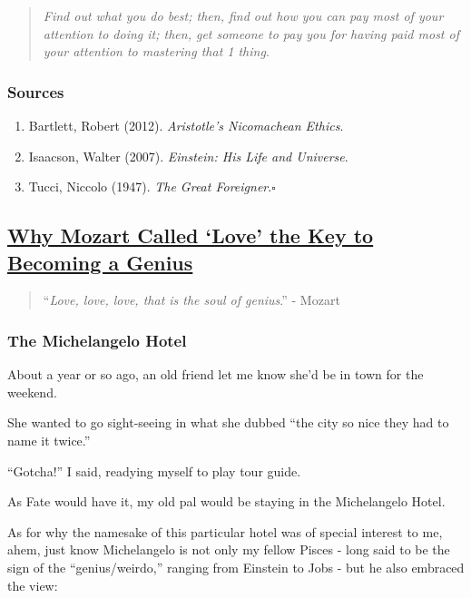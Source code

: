 \documentclass{article}
\begin{document}
\begin{quotation}
	\textit{Find out what you do best; then, find out how you can pay most of your attention to doing it; then, get someone to pay you for having paid most of your attention to mastering that 1 thing}.
\end{quotation}

\subsubsection{Sources}

\begin{enumerate}
	\item Bartlett, Robert (2012). \textit{Aristotle's Nicomachean Ethics}.
	\item Isaacson, Walter (2007). \textit{Einstein: His Life and Universe}.
	\item Tucci, Niccolo (1947). \textit{The Great Foreigner}.\hfill$\square$
\end{enumerate}


\subsection{\href{https://psiloveyou.xyz/why-mozart-called-love-the-key-to-becoming-a-genius-f2141ac4c9ae}{Why Mozart Called `Love' the Key to Becoming a Genius}}

\begin{quotation}
	``\textit{Love, love, love, that is the soul of genius}.'' - Mozart
\end{quotation}

\subsubsection{The Michelangelo Hotel}
About a year or so ago, an old friend let me know she'd be in town for the weekend.

She wanted to go sight-seeing in what she dubbed ``the city so nice they had to name it twice.''

%
``Gotcha!'' I said, readying myself to play tour guide.

%
As Fate would have it, my old pal would be staying in the Michelangelo Hotel.

%
As for why the namesake of this particular hotel was of special interest to me, ahem, just know Michelangelo is not only my fellow Pisces - long said to be the sign of the ``genius/weirdo,'' ranging from Einstein to Jobs - but he also embraced the view:
\end{document}
